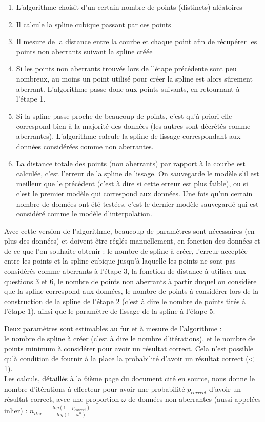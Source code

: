 \documentclass[a4paper,12pt]{article} %
\begin{document}
\begin{enumerate}
\item
L'algorithme choisit d'un certain nombre de points (distincts) aléatoires
\item
Il calcule la spline cubique passant par ces points 
\item
Il mesure de la distance entre la courbe et chaque point afin de récupérer les points non aberrants suivant la spline créée
\item
Si les points non aberrants trouvés lors de l'étape précédente sont peu nombreux, au moins un point utilisé pour créer la spline est alors sûrement aberrant. L'algorithme passe donc aux points suivants, en retournant à l'étape 1.
\item
Si la spline passe proche de beaucoup de points, c'est qu'à priori elle correspond bien à la majorité des données (les autres sont décrétés comme aberrantes).  L'algorithme calcule la spline de lissage correspondant aux données considérées comme non aberrantes.
\item
La distance totale des points (non aberrants) par rapport à la courbe est calculée, c'est l'erreur de la spline de lissage. On sauvegarde le modèle s'il est meilleur que le précédent (c'est à dire si cette erreur est plus faible), ou si c'est le premier modèle qui correspond aux données.
Une fois qu'un certain nombre de données ont été testées, c'est le dernier modèle sauvegardé qui est considéré comme le modèle d'interpolation.
\end{enumerate} 

Avec cette version de l'algorithme, beaucoup de paramètres sont nécessaires (en plus des données) et doivent être réglés manuellement, en fonction des données et de ce que l'on souhaite obtenir : le nombre de spline à créer, l'erreur acceptée entre les points et la spline cubique jusqu'à laquelle les points ne sont pas considérés comme aberrants à l'étape 3, la fonction de distance à utiliser aux questions 3 et 6, le nombre de points non aberrants à partir duquel on considère que la spline correspond aux données, le nombre de points à considérer lors de la construction de la spline de l'étape 2 (c'est à dire le nombre de points tirés à l'étape 1), ainsi que le paramètre de lissage de la spline à l'étape 5.

Deux paramètres sont estimables au fur et à mesure de l'algorithme :\\ le nombre de spline à créer (c'est à dire le nombre d'itérations), et le nombre de points minimum à considérer pour avoir un résultat correct. Cela n'est possible qu'à condition de fournir à la place la probabilité d'avoir un résultat correct (< 1). \\
Les calculs, détaillés à la 6ième page du document cité en source, nous donne le nombre d'itérations à effecteur pour avoir une probabilité $p_{correct}$ d'avoir un résultat correct, avec une proportion $\omega$ de données non aberrantes (aussi appelées inlier) : $n_{iter} = \frac{log(1 - p_{correct})}{log(1 - \omega^n)}$
\end{document}
